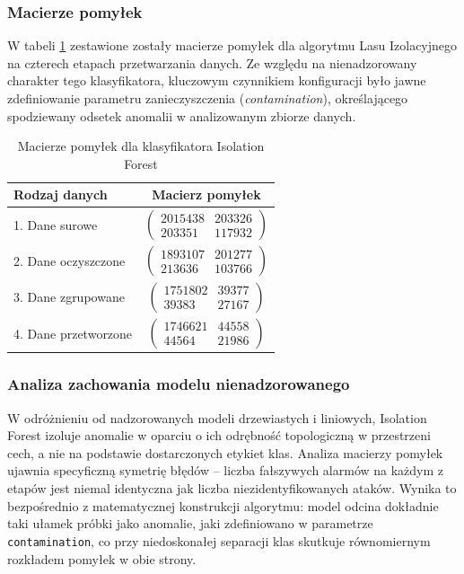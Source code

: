 \documentclass[12pt,twoside]{article}
\begin{document}
\subsubsection{Macierze pomyłek}

W tabeli \ref{tab:cm_isolation_forest} zestawione zostały macierze pomyłek dla algorytmu Lasu Izolacyjnego na czterech etapach przetwarzania danych. 
Ze względu na nienadzorowany charakter tego klasyfikatora, kluczowym czynnikiem konfiguracji było jawne zdefiniowanie parametru zanieczyszczenia (\emph{contamination}), określającego spodziewany odsetek anomalii w analizowanym zbiorze danych.

\begin{table}[ht]
\caption{Macierze pomyłek dla klasyfikatora Isolation Forest}
\centering
\renewcommand{\arraystretch}{1.3}
\begin{tabular}{|l|c|}
\hline
\textbf{Rodzaj danych} & \textbf{Macierz pomyłek} \\
\hline
1. Dane surowe & $\begin{pmatrix} 2015438 & 203326 \\ 203351 & 117932 \end{pmatrix}$ \\
\hline
2. Dane oczyszczone & $\begin{pmatrix} 1893107 & 201277 \\ 213636 & 103766 \end{pmatrix}$ \\
\hline
3. Dane zgrupowane & $\begin{pmatrix} 1751802 & 39377 \\ 39383 & 27167 \end{pmatrix}$ \\
\hline
4. Dane przetworzone & $\begin{pmatrix} 1746621 & 44558 \\ 44564 & 21986 \end{pmatrix}$ \\
\hline
\end{tabular}
\label{tab:cm_isolation_forest}
\end{table}

\subsubsection{Analiza zachowania modelu nienadzorowanego}

W odróżnieniu od nadzorowanych modeli drzewiastych i liniowych, Isolation Forest izoluje anomalie w oparciu o ich odrębność topologiczną w przestrzeni cech, a nie na podstawie dostarczonych etykiet klas. 
Analiza macierzy pomyłek ujawnia specyficzną symetrię błędów – liczba fałszywych alarmów na każdym z etapów jest niemal identyczna jak liczba niezidentyfikowanych ataków. 
Wynika to bezpośrednio z matematycznej konstrukcji algorytmu: model odcina dokładnie taki ułamek próbki jako anomalie, jaki zdefiniowano w parametrze \texttt{contamination}, co przy niedoskonałej separacji klas skutkuje równomiernym rozkładem pomyłek w obie strony.
\end{document}

